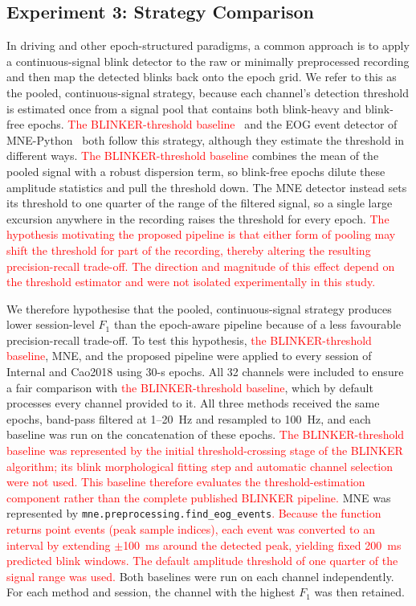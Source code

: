 \documentclass[journal,twoside,web]{ieeecolor}
\newcommand{\rev}[1]{\textcolor{red}{#1}}
\begin{document}
%
%
%
%
%
%
%




%
%
%
\subsection{Experiment 3: Strategy Comparison}
\label{sec:exp3_strategy}
%

%
In driving and other epoch-structured paradigms, a common approach is to apply a continuous-signal blink detector to the raw or minimally preprocessed recording and then map the detected blinks back onto the epoch grid. We refer to this as the pooled, continuous-signal strategy, because each channel's detection threshold is estimated once from a signal pool that contains both blink-heavy and blink-free epochs. \rev{The BLINKER-threshold baseline}~\citep{kleifges2017blinker} and the EOG event detector of MNE-Python~\citep{GramfortEtAl2013a} both follow this strategy, although they estimate the threshold in different ways.
\rev{The BLINKER-threshold baseline} combines the mean of the pooled signal with a robust dispersion term, so blink-free epochs dilute these amplitude statistics and pull the threshold down. The MNE detector instead sets its threshold to one quarter of the range of the filtered signal, so a single large excursion anywhere in the recording raises the threshold for every epoch. %
\rev{The hypothesis motivating the proposed pipeline is that either form of pooling may shift the threshold for part of the recording, thereby altering the resulting precision-recall trade-off. The direction and magnitude of this effect depend on the threshold estimator and were not isolated experimentally in this study.}
 
%
We therefore hypothesise that the pooled, continuous-signal strategy produces lower session-level $F_1$ than the epoch-aware pipeline because of a less favourable precision-recall trade-off. To test this hypothesis, \rev{the BLINKER-threshold baseline}, MNE, and the proposed pipeline were applied to every session of Internal and Cao2018 using 30-s epochs. All 32 channels were included to ensure a fair comparison with \rev{the BLINKER-threshold baseline}, which by default processes every channel provided to it. All three methods received the same epochs, band-pass filtered at 1--20~Hz and resampled to 100~Hz, and each baseline was run on the concatenation of these epochs. %
\rev{The BLINKER-threshold baseline was represented by the initial threshold-crossing stage of the BLINKER algorithm; its blink morphological fitting step and automatic channel selection were not used. This baseline therefore evaluates the threshold-estimation component rather than the complete published BLINKER pipeline.} MNE was represented by \texttt{mne.preprocessing.find\_eog\_events}\rev{. Because the function returns point events (peak sample indices), each event was converted to an interval by extending $\pm$100~ms around the detected peak, yielding fixed 200~ms predicted blink windows. The default amplitude threshold of one quarter of the signal range was used.} Both baselines were run on each channel independently.
For each method and session, the channel with the highest $F_1$ was then retained. %
%
 
\end{document}
